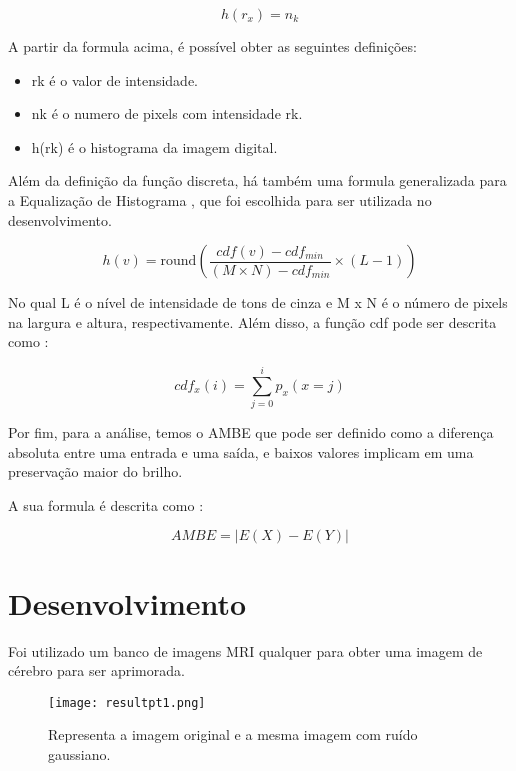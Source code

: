 \documentclass[conference]{IEEEtran}
\begin{document}
\begin{equation}
h(r_{x}) = n_{k}
\end{equation}

A partir da formula acima, é possível obter as seguintes definições:

\begin{itemize}
\item rk é o valor de intensidade.
\item nk é o numero de pixels com intensidade rk.
\item h(rk) é o histograma da imagem digital.
\end{itemize}

Além da definição da função discreta, há também uma formula generalizada para a Equalização de Histograma \cite{b13}, que foi escolhida para ser utilizada no desenvolvimento. 

\begin{equation}
h(v)=\mathrm {round} \left({\frac {cdf(v)-cdf_{min}}{(M\times N)-cdf_{min}}}\times (L-1)\right)
\end{equation}

No qual L é o nível de intensidade de tons de cinza e M x N é o número de pixels na largura e altura, respectivamente. Além disso, a função cdf pode ser descrita como \cite{b13}:

\begin{equation}
cdf_{x}(i)=\sum _{j=0}^{i}p_{x}(x=j)
\end{equation}

Por fim, para a análise, temos o AMBE que pode ser definido como a diferença absoluta entre uma entrada e uma saída, e baixos valores implicam em uma preservação maior do brilho. 

A sua formula é descrita como \cite{b12}:

\begin{equation}
AMBE = |E(X) - E(Y)|     
\end{equation}

\section{Desenvolvimento}

Foi utilizado um banco de imagens MRI qualquer para obter uma imagem de cérebro para ser aprimorada.

\begin{figure}[H]
    \centering
    \texttt{[image: resultpt1.png]}
    \caption{Representa a imagem original e a mesma imagem com ruído gaussiano.}
    \label{fig:label1}
\end{figure}
\end{document}

